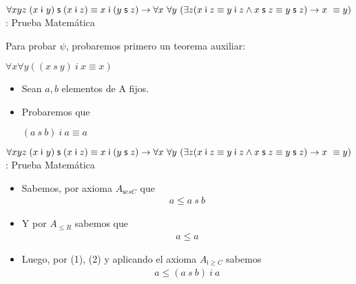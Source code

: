 \documentclass[10pt]{beamer}
\newcommand{\Cfonti}{\fontsize{8.5}{7.2}\selectfont}
\newcommand{\Nrefl}{{A}_{\leq R}}
\newcommand{\NsCot}{{A}_{\mathsf{s}esC}}
\newcommand{\NiGrCot}{{A}_{\mathsf{i}\geq C}}
\newcommand{\idistr}{\forall xyz\;(x\;\mathsf{i}\
y)\;\mathsf{s}\;(x\;\mathsf{i}\;z)\equiv x\;\mathsf{i}\;(y\;\mathsf{s}%
\;z)}
\newcommand{\myconj}{x\;\mathsf{i}\;z\equiv y\;\mathsf{%
i}\;z\wedge x\;\mathsf{s}\;z\equiv y\;\mathsf{s}\;z}
\begin{document}
\begin{frame}{\Cfonti$\idistr \rightarrow \forall x\ \forall y\ (\exists z (\myconj) \rightarrow x\ \equiv y)$: Prueba Matemática}

  Para probar $\psi$, probaremos primero un teorema auxiliar:
  \begin{center}
    $\forall x \forall y ((x\ s\ y)\ i\ x \equiv x)$
  \end{center}
  \pause

  \begin{itemize}[<+->]

    \item Sean $a, b$ elementos de A fijos.
    \item Probaremos que
    \begin{center}
      $(a\ s\ b)\ i\ a \equiv a$
    \end{center}

  \end{itemize}

\end{frame}

\begin{frame}{\Cfonti$\idistr \rightarrow \forall x\ \forall y\ (\exists z (\myconj) \rightarrow x\ \equiv y)$:
   Prueba Matemática}
  \begin{itemize}[<+->]

    \item Sabemos, por axioma $\NsCot$ que
    \begin{align}
      a \leq a\ s\ b \label{eq8}
    \end{align}

    \item Y por $\Nrefl$ sabemos que
    \begin{align}
      a \leq a \label{eq9}
    \end{align}

    \item Luego, por (1), (2) y aplicando el axioma $\NiGrCot$ sabemos
    \begin{align}
      a \leq (a\ s\ b)\ i\ a \label{eq10}
    \end{align}

  \end{itemize}
\end{frame}
\end{document}
